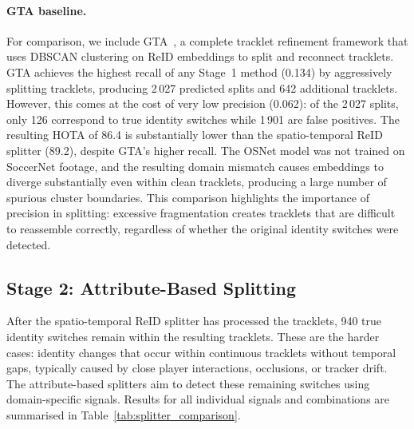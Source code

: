 \paragraph{GTA baseline.}
For comparison, we include GTA~\cite{gta}, a complete tracklet refinement framework that uses DBSCAN clustering on ReID embeddings to split and reconnect tracklets. GTA achieves the highest recall of any Stage~1 method (0.134) by aggressively splitting tracklets, producing 2\,027 predicted splits and 642 additional tracklets. However, this comes at the cost of very low precision (0.062): of the 2\,027 splits, only 126 correspond to true identity switches while 1\,901 are false positives. The resulting HOTA of 86.4 is substantially lower than the spatio-temporal ReID splitter (89.2), despite GTA's higher recall. The OSNet model was not trained on SoccerNet footage, and the resulting domain mismatch causes embeddings to diverge substantially even within clean tracklets, producing a large number of spurious cluster boundaries. This comparison highlights the importance of precision in splitting: excessive fragmentation creates tracklets that are difficult to reassemble correctly, regardless of whether the original identity switches were detected.

\subsection{Stage 2: Attribute-Based Splitting}\label{subsec:stage2_splitting}

After the spatio-temporal ReID splitter has processed the tracklets, 940 true identity switches remain within the resulting tracklets. These are the harder cases: identity changes that occur within continuous tracklets without temporal gaps, typically caused by close player interactions, occlusions, or tracker drift. The attribute-based splitters aim to detect these remaining switches using domain-specific signals. Results for all individual signals and combinations are summarised in Table~\ref{tab:splitter_comparison}.


